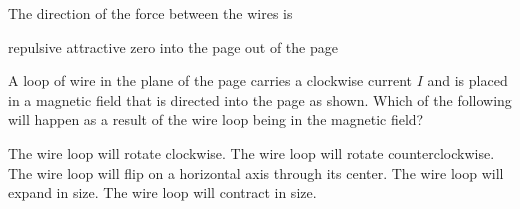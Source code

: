 \documentclass{../../../oss-ap12ibhl}
\begin{document}
\begin{questions}
  \question The direction of the force between the wires is
  \begin{choices}
    \choice repulsive
    \choice attractive
    \choice zero
    \choice into the page
    \choice out of the page
  \end{choices}
  \label{q:2curr2}
    
  \question A loop of wire in the plane of the page carries a clockwise current
  $I$ and is placed in a magnetic field that is directed into the page as shown.
  Which of the following will happen as a result of the wire loop being in
  the magnetic field?
  
  \begin{minipage}{.25\linewidth}
  \end{minipage}
  \begin{minipage}{.5\linewidth}
    \begin{choices}
      \choice The wire loop will rotate clockwise.
      \choice The wire loop will rotate counterclockwise.
      \choice The wire loop will flip on a horizontal axis through its center.
      \choice The wire loop will expand in size.
      \choice The wire loop will contract in size.
    \end{choices}
  \end{minipage}
  \vspace{.2in}

  \newpage
  
  

\end{questions}
\end{document}
